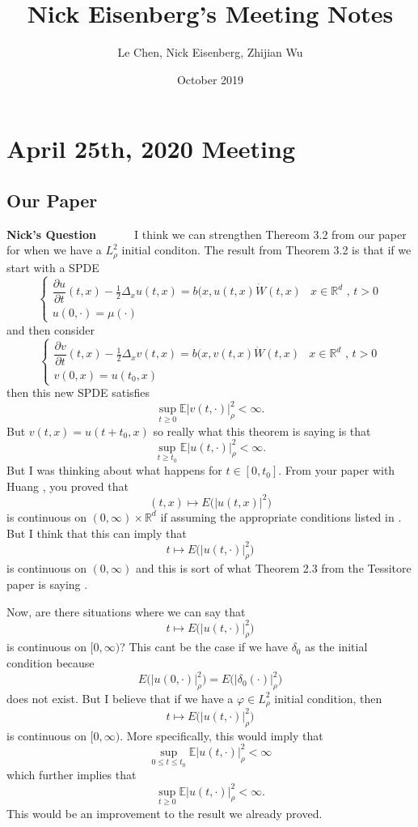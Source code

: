 \documentclass[a4paper,11pt]{article}
\title{Nick Eisenberg's Meeting Notes}
\author{Le Chen, Nick Eisenberg, Zhijian Wu}
\date{October 2019}
\theoremstyle{plain}
\theoremstyle{definition}
\newcommand{\E}{\mathbb{E}}
\newcommand{\R}{\mathbb{R}}
\newcounter{NQ}
\newenvironment{NickQuestion}[1][] %
  {\refstepcounter{NQ}
  \begin{mdframed}[backgroundcolor=lightgray]\textbf{Nick's Question \theNQ \: #1~~}~~~\noindent}%
  {\end{mdframed}}
\numberwithin{NQ}{section}
\numberwithin{LQ}{section}
\numberwithin{ZQ}{section}
\begin{document}
\section{April 25th, 2020 Meeting}
\subsection{Our Paper}
\begin{NickQuestion}
I think we can strengthen Thereom 3.2 from our paper for when we have a $L^2_\rho$ initial conditon. The result from Theorem 3.2 is that if we start with a SPDE 
$$  \begin{cases}
 \dfrac{\partial u}{\partial t}(t,x)-\frac{1}{2}\Delta_x u(t,x) = b(x,u(t,x)\dot W(t,x) & \text{$x\in \mathbb R^d$ , $t>0$}
 \\ u(0,\cdot) = \mu(\cdot)  & 
 \end{cases} $$
 and then consider 
 $$  \begin{cases}
 \dfrac{\partial v}{\partial t}(t,x)-\frac{1}{2}\Delta_x v(t,x) = b(x,v(t,x)\dot W(t,x) & \text{$x\in \mathbb R^d$ , $t>0$}
 \\ v(0,x) = u(t_0,x)  & 
 \end{cases} $$
 then this new SPDE satisfies 
 $$ \sup_{t\ge 0} \E |v(t,\cdot)|_\rho^2 < \infty.$$
But $v(t,x)=u(t+t_0,x)$ so really what this theorem is saying is that 
$$ \sup_{t\ge t_0} \E |u(t,\cdot)|_\rho^2 < \infty. $$
But I was thinking about what happens for $t\in[0,t_0]$. From your paper with Huang \cite{CH16Comparison}, you proved that 
$$ (t,x) \mapsto E\big(|u(t,x)|^2\big)$$ 
is continuous on $(0,\infty)\times \R^d$ if assuming the appropriate conditions listed in \cite{CH16Comparison}. But I think that this can imply that 
$$ t \mapsto E\big(|u(t,\cdot)|_\rho^2\big) $$ is continuous on $(0,\infty)$ and this is sort of what Theorem 2.3 from the Tessitore paper is saying \cite{TessitoreZabczyk98M}.

Now, are there situations where we can say that 
$$t \mapsto E\big(|u(t,\cdot)|_\rho^2\big) $$ is continuous on $[0,\infty)$? This cant be the case if we have $\delta_0$ as the initial condition because 
$$ E\big(|u(0,\cdot)|_\rho^2\big) = E\big(|\delta_0(\cdot)|_\rho^2\big)$$
does not exist. But I believe that if we have a $\varphi \in L^2_\rho$ initial condition, then
$$t \mapsto E\big(|u(t,\cdot)|_\rho^2\big) $$ is continuous on $[0,\infty)$. More specifically, this would imply that 
$$ \sup_{0\le t\le t_0} \E |u(t,\cdot)|_\rho^2 < \infty $$ which further implies that 
$$\sup_{t \ge 0} \E |u(t,\cdot)|_\rho^2 < \infty.$$
This would be an improvement to the result we already proved. 
\end{NickQuestion}
\end{document}
